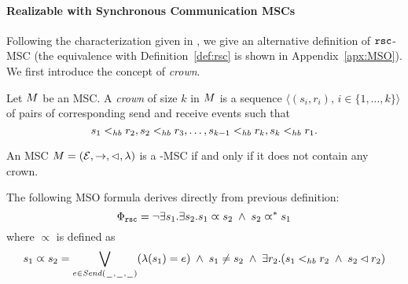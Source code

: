 \paragraph{\bf Realizable with Synchronous Communication MSCs} 

Following the characterization given in \cite[Theorem 4.4]{DBLP:journals/dc/Charron-BostMT96}, we  give an alternative definition of $\mathtt{rsc}$-MSC (the equivalence with Definition~\ref{def:rsc} is shown in Appendix~\ref{apx:MSO}). We first  introduce the concept of \emph{crown}.

\begin{definition} [crown]
	Let $M$ be an MSC. A \emph{crown} of size $k$ in $M$ is a sequence $\langle(s_i,r_i),\, i \in \{1,\dots,k\}\rangle$ of pairs of corresponding send and receive events such that
	\[
		s_1 <_{hb} r_2, s_2 <_{hb} r_3, \dots, s_{k-1} <_{hb} r_k, s_k <_{hb} r_1.
	\]
\end{definition}

\begin{definition} \label{def:rsc_alt}
	An MSC $M = (\mathcal{E},\to,\lhd,\lambda)$ is a \rsc-MSC if and only if it does not contain any crown.
\end{definition}


The following MSO formula derives directly from previous  definition:
\[\Phi_{\mathtt{rsc}} = \neg \exists s_1.\exists s_2. s_1 \varpropto s_2 \;\wedge\; s_2 \varpropto^\ast s_1
\]
\noindent where $\varpropto$ is defined as
\[
s_1 \varpropto s_2 =
\bigvee_{\substack{e \in {\mathit{Send}(\hspace{0.1em}\underline{\hspace{0.5em}}\hspace{0.1em},\hspace{0.1em}\underline{\hspace{0.5em}}\hspace{0.1em},\hspace{0.1em}\underline{\hspace{0.5em}}\hspace{0.1em})}}}(\lambda(s_1) = e) \;\wedge\;
s_1 \neq s_2 \;\wedge\;
\exists r_2. (s_1 <_{hb} r_2 \;\wedge\; s_2 \lhd r_2)
\]


